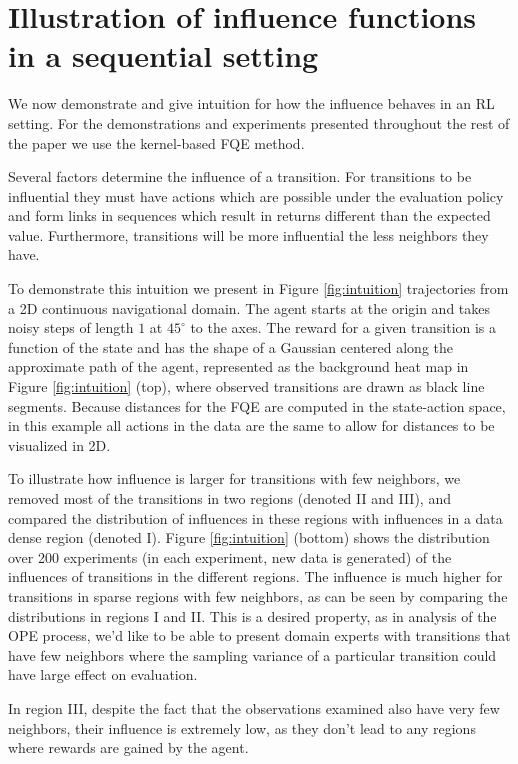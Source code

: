 \documentclass{article}
\begin{document}
\section{Illustration of influence functions in a sequential setting}
\label{sec:intuition}

We now demonstrate and give intuition for how the influence behaves in an RL setting. For the demonstrations and experiments presented throughout the rest of the paper we use the kernel-based FQE method.

Several factors determine the influence of a transition. For transitions to be influential they must have actions which are possible under the evaluation policy and form links in sequences which result in returns different than the expected value. Furthermore, transitions will be more influential the less neighbors they have.

To demonstrate this intuition we present in Figure \ref{fig:intuition} trajectories from a 2D continuous navigational domain. The agent starts at the origin and takes noisy steps of length $1$ at $45^{\circ}$ to the axes. The reward for a given transition is a function of the state and has the shape of a Gaussian centered along the approximate path of the agent, represented as the background heat map in Figure \ref{fig:intuition} (top), where observed transitions are drawn as black line segments. Because distances for the FQE are computed in the state-action space, in this example all actions in the data are the same to allow for distances to be visualized in 2D.

To illustrate how influence is larger for transitions with few neighbors, we removed most of the transitions in two regions (denoted II and III), and compared the distribution of  influences in these regions with influences in a data dense region (denoted I). Figure \ref{fig:intuition} (bottom)  shows the distribution over 200 experiments (in each experiment, new data is generated) of the influences of transitions in the different regions. The influence is much higher for transitions in sparse regions with few neighbors, as can be seen by comparing the distributions in regions I and II.  This is a desired property, as in analysis of the OPE process, we'd like to be able to present domain experts with transitions that have few neighbors where the sampling variance of a particular transition could have large effect on evaluation.

In region III, despite the fact that the observations examined also have very few neighbors, their influence is extremely low, as they don't lead to any regions where rewards are gained by the agent.
\end{document}
